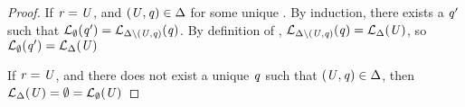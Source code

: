 \begin{proof}
If $\mathit{r}=\mathit{U}$, and $(\mathit{U},\mathit{q})\in\Delta$ for
some unique \RegexAlt{}.
By induction, there exists a $\mathit{q}'$ such that
$\mathcal{L}_{\emptyset}(\mathit{q}')=\mathcal{L}_{\Delta\setminus(\mathit{U},\mathit{q})}(\mathit{q})$.
By definition of \Language{}, $\mathcal{L}_{\Delta\setminus(\mathit{U},\mathit{q})}(\mathit{q})=\mathcal{L}_{\Delta}(\mathit{U})$, so 
$\mathcal{L}_{\emptyset}(\mathit{q}')=\mathcal{L}_{\Delta}(\mathit{U})$

If $\mathit{r}=\mathit{U}$, and there does not exist a unique $\mathit{q}$ such that
$(\mathit{U},\mathit{q})\in\Delta$, then
$\mathcal{L}_{\Delta}(\mathit{U})=\emptyset=\mathcal{L}_{\emptyset}(\mathit{U})$
\end{proof}

\bls*
